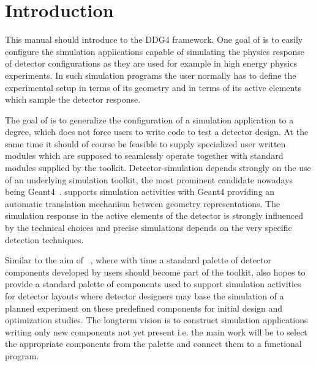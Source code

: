 \documentclass[10pt,a4paper]{article}
\begin{document}
\clearpage
%
%
\tableofcontents
\clearpage
%
%
\setcounter{page}{1}

\section{Introduction}
\label{sec:ddg4-user-manual-introduction}
\noindent
This manual should introduce to the DDG4 framework. 
One goal of \DDG is to easily configure the simulation applications
capable of simulating the physics response of detector configurations 
as they are used for example in high energy physics experiments.
In such simulation programs the user normally has to define the 
experimental setup in terms of its geometry and in terms of its 
active elements which sample the detector response.

\noindent
The goal of \DDG is to generalize the configuration of a simulation
application to a degree, which does not force users to write code
to test a detector design. At the same time it should of course
be feasible to supply specialized user written modules which are supposed
to seamlessly operate together with standard modules supplied by the toolkit.
Detector-simulation depends strongly on the use of an underlying simulation
toolkit, the most prominent candidate nowadays being Geant4~\cite{bib:geant4}.
\DDhep supports simulation activities with Geant4 providing
an automatic translation mechanism between geometry representations.
The simulation response in the active elements of the detector
is strongly influenced by the technical 
choices and precise simulations depends on the very specific detection techniques.

\noindent
Similar to the aim of \DDhep~\cite{bib:DD4hep}, 
where with time a standard palette of detector
components developed by users should become part of the toolkit,
\DDG also hopes to provide a standard palette of components used
to support simulation activities for detector layouts
where detector designers may base the simulation of a planned experiment 
on these predefined components for initial design and optimization 
studies. The longterm vision is to construct simulation applications
writing only new components not yet present i.e. the main work will be to
select the appropriate components from the palette and connect them
to a functional program.
\end{document}
